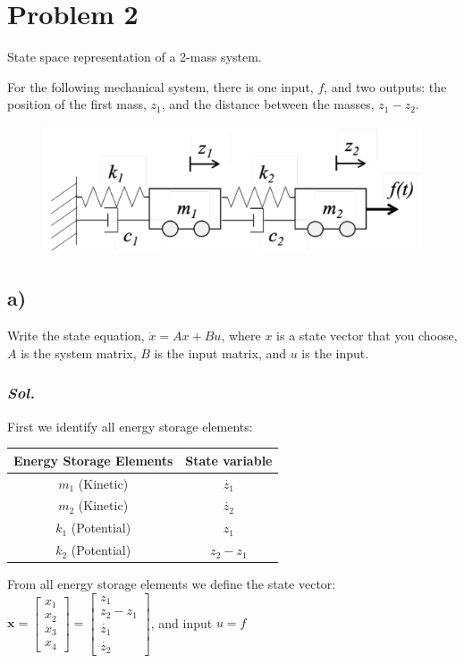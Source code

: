 \section{Problem 2}
State space representation of a 2-mass system.

For the following mechanical system, there is one input, $f$, and two outputs: the position of the first mass, $z_1$, and the distance between the masses, $z_1 - z_2$.

\begin{figure}[htp]
    \centering
    \includegraphics[width=15cm]{images/Q2.png}
\end{figure}

\subsection{a)}
Write the state equation, $\dot{x}=Ax+Bu$, where $x$ is a state vector that you choose, $A$ is the system matrix, $B$ is the input matrix, and $u$ is the input.
\subsubsection{\textit{ Sol. }}

First we identify all energy storage elements:

\begin{table}[ht]
    \centering
    \begin{tabular}{c | c}
        Energy Storage Elements & State variable
        \\
        \hline
        $m_1$ (Kinetic) & $\dot{z_1}$ \\
        $m_2$ (Kinetic) & $\dot{z_2}$ \\
        $k_1$ (Potential) & $z_1$ \\
        $k_2$ (Potential) & $z_2 - z_1$
    \end{tabular}
\end{table}

From all energy storage elements we define the state vector: $\textbf{x} = 
\begin{bmatrix}
    x_1\\
    x_2\\ 
    x_3\\ 
    x_4
\end{bmatrix} = 
\begin{bmatrix}
    z_1\\
    z_2 - z_1\\ 
    \dot{z_1}\\ 
    \dot{z_2}
\end{bmatrix}$, and input $u = f$

